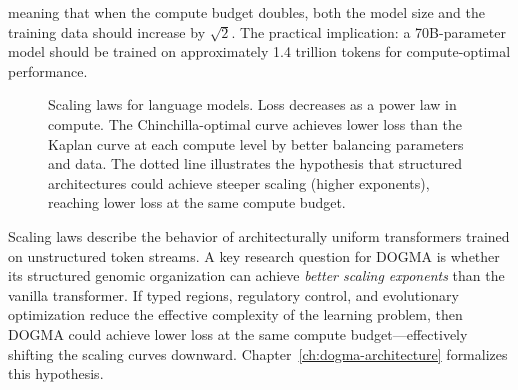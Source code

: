 meaning that when the compute budget doubles, both the model size and the training data should increase by $\sqrt{2}$. The practical implication: a 70B-parameter model should be trained on approximately 1.4 trillion tokens for compute-optimal performance.

\begin{figure}[ht]
\centering
{}
\caption{Scaling laws for language models. Loss decreases as a power law in compute. The Chinchilla-optimal curve achieves lower loss than the Kaplan curve at each compute level by better balancing parameters and data. The dotted line illustrates the hypothesis that structured architectures could achieve steeper scaling (higher exponents), reaching lower loss at the same compute budget.}
\label{fig:scaling-laws}
\end{figure}

\begin{implnote}
Scaling laws describe the behavior of architecturally uniform transformers trained on unstructured token streams. A key research question for DOGMA is whether its structured genomic organization can achieve \emph{better scaling exponents} than the vanilla transformer. If typed regions, regulatory control, and evolutionary optimization reduce the effective complexity of the learning problem, then DOGMA could achieve lower loss at the same compute budget---effectively shifting the scaling curves downward. Chapter~\ref{ch:dogma-architecture} formalizes this hypothesis.
\end{implnote}

